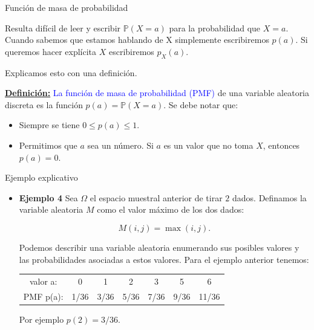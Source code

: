 \documentclass[10pt]{beamer}
\begin{document}
\begin{frame}{Funci\'on de masa de probabilidad }
	
Resulta dif\'icil de leer y escribir $\mathbb{P}(X = a)$ para la probabilidad  que $X = a$. Cuando sabemos que estamos hablando de X simplemente escribiremos $p(a)$. Si queremos hacer expl\'icita  $X$ escribiremos $p_X(a)$.
	
Explicamos esto con  una definici\'on.

\vspace{0.2cm}

\textbf{\small{\underline{Definici\'on:}}} \textcolor{blue}{La funci\'on de masa de probabilidad (PMF)} de una variable aleatoria discreta es la funci\'on $p(a) = \mathbb{P}(X =a)$. Se debe notar que:

\begin{itemize}
	\item Siempre se tiene $0 \leq p(a)\leq 1$.
	\item Permitimos que $a$ sea un n\'umero. Si $a$ es un valor que no toma $X$, entonces $p(a) = 0$.
\end{itemize}

\end{frame}

\begin{frame}{Ejemplo explicativo}

\begin{itemize}
\item \small {\textbf{Ejemplo 4}
Sea $\Omega$ el espacio muestral anterior de tirar $2$ dados. Definamos la variable aleatoria $M$ como el valor m\'aximo de los dos dados:

\[
M(i,j) = \max(i, j).
\]

Podemos describir una variable aleatoria enumerando sus posibles valores y las probabilidades asociadas a estos valores. Para el ejemplo anterior tenemos:

\vspace{0.2cm}

\begin{table}[]
	\centering
	\begin{tabular}{ccccccc}
		valor  a:    & 0    & 1    & 2    & 3    & 5    & 6     \\
		PMF    p(a): & 1/36 & 3/36 & 5/36 & 7/36 & 9/36 & 11/36
	\end{tabular}
\end{table}

\vspace{0.2cm}

Por ejemplo $p(2) = 3/36$.
}
\end{itemize}
\end{frame}
\end{document}
